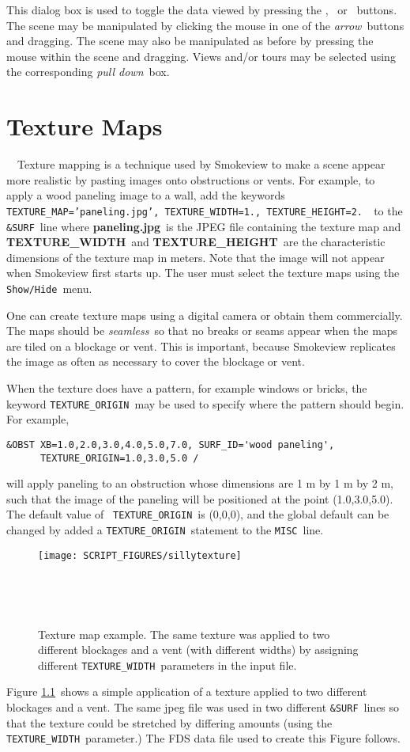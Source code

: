 \documentclass[11pt,twoside]{book}
\newcommand{\frameit}[1]{\fbox{\tt #1}}
\begin{document}
This dialog box is used to toggle the data viewed by pressing the
\frameit{Smoke/Fire}, \frameit{Temperature}\ or \frameit{Oxygen}\
buttons. The scene may be manipulated by clicking the mouse in one
of the {\em arrow}\ buttons and dragging.  The scene may also be
manipulated as before by pressing the mouse within the scene and
dragging. Views and/or tours may be selected using the
corresponding {\em pull down}\ box.

\chapter{Texture Maps}\ \label{chapter:texturemaps}\ Texture mapping is a technique used by
Smokeview to make a scene appear more realistic by pasting images
onto obstructions or vents. For example, to apply a wood paneling
image to a wall, add the keywords {\tt
TEXTURE\_MAP='paneling.jpg', TEXTURE\_WIDTH=1., TEXTURE\_HEIGHT=2.
}\ to the {\tt \&SURF}\ line where {\bf paneling.jpg}\ is the JPEG
file containing the texture map and {\bf TEXTURE\_WIDTH}\ and {\bf
TEXTURE\_HEIGHT}\ are the characteristic dimensions of the texture
map in meters. Note that the image will not appear when Smokeview
first starts up. The user must select the texture maps using the
{\tt Show/Hide}\ menu.

One can create texture maps using a digital camera or obtain them
commercially.  The maps should be {\em seamless}\ so that no
breaks or seams appear when the maps are tiled on a blockage or
vent.  This is important, because Smokeview replicates the image
as often as necessary to cover the blockage or vent.

When the texture does have a pattern, for example windows or
bricks, the keyword {\tt TEXTURE\_ORIGIN}\ may be used to specify
where the pattern should begin.  For example,
\begin{lstlisting}
&OBST XB=1.0,2.0,3.0,4.0,5.0,7.0, SURF_ID='wood paneling',
      TEXTURE_ORIGIN=1.0,3.0,5.0 /
\end{lstlisting}
\noindent will apply paneling to an obstruction whose dimensions
are 1 m by 1 m by 2 m, such that the image of the paneling will be
positioned at the point (1.0,3.0,5.0). The default value of {\tt
TEXTURE\_ORIGIN}\ is (0,0,0), and the global default can be changed
by added a {\tt TEXTURE\_ORIGIN}\ statement to the {\tt MISC}\ line.

\begin{figure}[bph]
\centerline{\texttt{[image: SCRIPT\_FIGURES/sillytexture]}
}\ \caption [Texture map example.] {
Texture map example.  The same texture was applied to two different
blockages and a vent (with different widths) by assigning different {\tt TEXTURE\_WIDTH}\
parameters in the input file.
}\ \label{figTextures}
\end{figure}
Figure \ref{figTextures}\ shows a simple application of a texture
applied to two different blockages and a vent.  The same jpeg file
was used in two different {\tt \&SURF}\ lines so that the texture
could be stretched by differing amounts (using the {\tt
TEXTURE\_WIDTH}\ parameter.)  The FDS data file used to create
this Figure follows.
\end{document}
